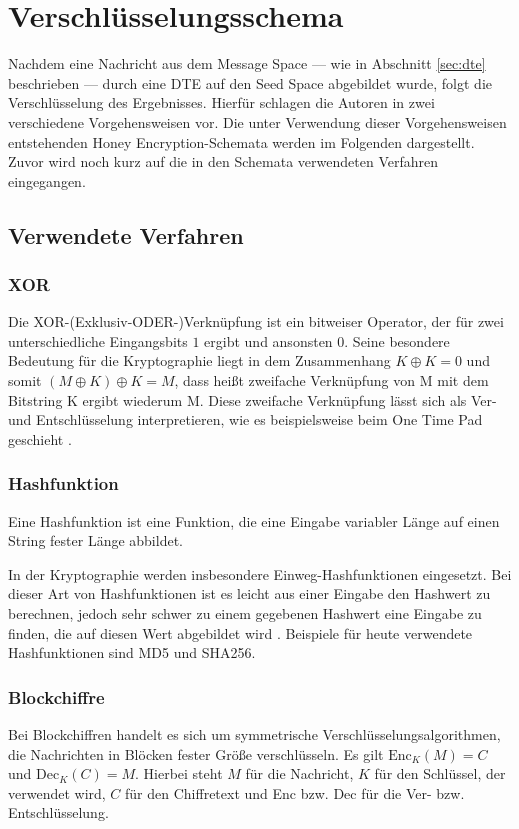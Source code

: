 \section{Verschlüsselungsschema}
\label{sec:schema}

Nachdem eine Nachricht aus dem Message Space --- wie in Abschnitt \ref{sec:dte} beschrieben --- durch eine DTE auf den Seed Space abgebildet wurde, folgt die Verschlüsselung des Ergebnisses. Hierfür schlagen die Autoren in \cite{EURO2014} zwei verschiedene Vorgehensweisen vor. Die unter Verwendung dieser Vorgehensweisen entstehenden Honey Encryption-Schemata werden im Folgenden dargestellt. Zuvor wird noch kurz auf die in den Schemata verwendeten Verfahren eingegangen.

\subsection{Verwendete Verfahren}

\subsubsection*{XOR}
Die XOR-(Exklusiv-ODER-)Verknüpfung ist ein bitweiser Operator, der für zwei unterschiedliche Eingangsbits $1$ ergibt und ansonsten $0$. Seine besondere Bedeutung für die Kryptographie liegt in dem Zusammenhang \(K \oplus K = 0\) und somit \((M \oplus K) \oplus K = M\), dass heißt zweifache Verknüpfung von M mit dem Bitstring K ergibt wiederum M. Diese zweifache Verknüpfung lässt sich als Ver- und Entschlüsselung interpretieren, wie es beispielsweise beim One Time Pad geschieht \cite{Schneier2006}.%

\subsubsection*{Hashfunktion}
Eine Hashfunktion ist eine Funktion, die eine Eingabe variabler Länge auf einen String fester Länge abbildet.

In der Kryptographie werden insbesondere Einweg-Hashfunktionen eingesetzt. Bei dieser Art von Hashfunktionen ist es leicht aus einer Eingabe den Hashwert zu berechnen, jedoch sehr schwer zu einem gegebenen Hashwert eine Eingabe zu finden, die auf diesen Wert abgebildet wird \cite{Schneier2006}. Beispiele für heute verwendete Hashfunktionen sind MD5 und SHA256.

\subsubsection*{Blockchiffre}
Bei Blockchiffren handelt es sich um symmetrische Verschlüsselungsalgorithmen, die Nachrichten in Blöcken fester Größe verschlüsseln. Es gilt \(\text{Enc}_K(M)=C\) und \(\text{Dec}_K(C)=M\). Hierbei steht \(M\) für die Nachricht, \(K\) für den Schlüssel, der verwendet wird, \(C\) für den Chiffretext und Enc bzw. Dec für die Ver- bzw. Entschlüsselung\cite{Schneier2006}.

